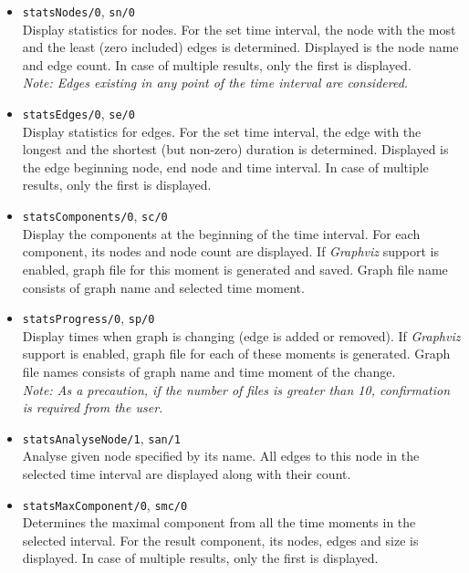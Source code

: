 \documentclass[11pt, a4paper,draft]{article}
\newcommand{\pl}[1]{\texttt{#1}} %
\theoremstyle{plain}
\theoremstyle{definition}
\theoremstyle{remark}
\newcommand{\gv}{\textit{Graphviz}}
\begin{document}
\begin{itemize}
\item \pl{statsNodes/0}, \pl{sn/0} \\
Display statistics for nodes. 
For the set time interval, the node with the most and the least (zero included) edges is determined. 
Displayed is the node name and edge count. 
In case of multiple results, only the first is displayed. \\
\textit{Note: Edges existing in any point of the time interval are considered.}

\item \pl{statsEdges/0}, \pl{se/0} \\
Display statistics for edges. 
For the set time interval, the edge with the longest and the shortest (but non-zero) duration is determined.  
Displayed is the edge beginning node, end node and time interval. 
In case of multiple results, only the first is displayed.

\item \pl{statsComponents/0}, \pl{sc/0} \\
Display the components at the beginning of the time interval. 
For each component, its nodes and node count are displayed. 
If \gv{} support is enabled, graph file for this moment is generated and saved. 
Graph file name consists of graph name and selected time moment.

\item \pl{statsProgress/0}, \pl{sp/0} \\
Display times when graph is changing (edge is added or removed). 
If \gv{} support is enabled, graph file for each of these moments is generated. 
Graph file names consists of graph name and time moment of the change. \\
\textit{Note: As a precaution, if the number of files is greater than 10, confirmation is required from the user.}

\item \pl{statsAnalyseNode/1}, \pl{san/1} \\
Analyse given node specified by its name. 
All edges to this node in the selected time interval are displayed along with their count.

\item \pl{statsMaxComponent/0}, \pl{smc/0} \\
Determines the maximal component from all the time moments in the selected interval. 
For the result component, its nodes, edges and size is displayed. 
In case of multiple results, only the first is displayed.
\end{itemize}
\end{document}
